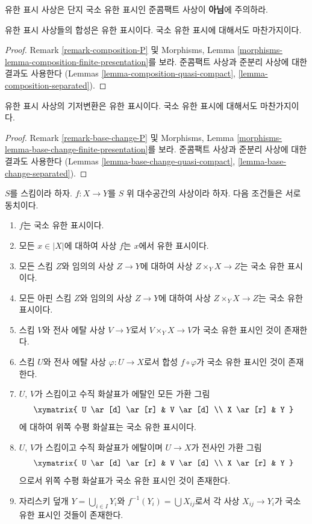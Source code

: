 \noindent
유한 표시 사상은 단지 국소 유한 표시인 준콤팩트 사상이
{\bf 아님}에 주의하라.

\begin{lemma}
\label{lemma-composition-finite-presentation}
유한 표시 사상들의 합성은 유한 표시이다.
국소 유한 표시에 대해서도 마찬가지이다.
\end{lemma}

\begin{proof}
Remark \ref{remark-composition-P} 및 Morphisms, Lemma
\ref{morphisms-lemma-composition-finite-presentation}를 보라.
준콤팩트 사상과 준분리 사상에 대한 결과도 사용한다
(Lemmas \ref{lemma-composition-quasi-compact},
\ref{lemma-composition-separated}).
\end{proof}

\begin{lemma}
\label{lemma-base-change-finite-presentation}
유한 표시 사상의 기저변환은 유한 표시이다.
국소 유한 표시에 대해서도 마찬가지이다.
\end{lemma}

\begin{proof}
Remark \ref{remark-base-change-P} 및 Morphisms, Lemma
\ref{morphisms-lemma-base-change-finite-presentation}를 보라.
준콤팩트 사상과 준분리 사상에 대한 결과도 사용한다
(Lemmas \ref{lemma-base-change-quasi-compact},
\ref{lemma-base-change-separated}).
\end{proof}

\begin{lemma}
\label{lemma-finite-presentation-local}
$S$를 스킴이라 하자.
$f : X \to Y$를 $S$ 위 대수공간의 사상이라 하자.
다음 조건들은 서로 동치이다.
\begin{enumerate}
\item $f$는 국소 유한 표시이다.
\item 모든 $x \in |X|$에 대하여 사상 $f$는 $x$에서 유한 표시이다.
\item 모든 스킴 $Z$와 임의의 사상 $Z \to Y$에 대하여 사상
$Z \times_Y X \to Z$는 국소 유한 표시이다.
\item 모든 아핀 스킴 $Z$와 임의의 사상 $Z \to Y$에 대하여 사상
$Z \times_Y X \to Z$는 국소 유한 표시이다.
\item 스킴 $V$와 전사 에탈 사상 $V \to Y$로서
$V \times_Y X \to V$가 국소 유한 표시인 것이 존재한다.
\item 스킴 $U$와 전사 에탈 사상 $\varphi : U \to X$로서
합성 $f \circ \varphi$가 국소 유한 표시인 것이 존재한다.
\item $U$, $V$가 스킴이고 수직 화살표가 에탈인 모든 가환 그림
$$
\xymatrix{
U \ar[d] \ar[r] & V \ar[d] \\
X \ar[r] & Y
}
$$
에 대하여 위쪽 수평 화살표는 국소 유한 표시이다.
\item $U$, $V$가 스킴이고 수직 화살표가 에탈이며
$U \to X$가 전사인 가환 그림
$$
\xymatrix{
U \ar[d] \ar[r] & V \ar[d] \\
X \ar[r] & Y
}
$$
으로서 위쪽 수평 화살표가 국소 유한 표시인 것이 존재한다.
\item 자리스키 덮개 $Y = \bigcup_{i \in I} Y_i$와
$f^{-1}(Y_i) = \bigcup X_{ij}$로서 각 사상
$X_{ij} \to Y_i$가 국소 유한 표시인 것들이 존재한다.
\end{enumerate}
\end{lemma}


